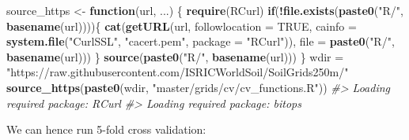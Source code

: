\documentclass[graybox,natbib,nospthms,UStrade]{svmono}
\newenvironment{Shaded}{\begin{snugshade}}{\end{snugshade}}
\newcommand{\CommentTok}[1]{\textcolor[rgb]{0.37,0.37,0.37}{\textit{#1}}}
\newcommand{\ControlFlowTok}[1]{\textcolor[rgb]{0.27,0.27,0.27}{\textbf{#1}}}
\newcommand{\DataTypeTok}[1]{\textcolor[rgb]{0.27,0.27,0.27}{#1}}
\newcommand{\KeywordTok}[1]{\textcolor[rgb]{0.27,0.27,0.27}{\textbf{#1}}}
\newcommand{\NormalTok}[1]{#1}
\newcommand{\OperatorTok}[1]{\textcolor[rgb]{0.43,0.43,0.43}{\textbf{#1}}}
\newcommand{\OtherTok}[1]{\textcolor[rgb]{0.37,0.37,0.37}{#1}}
\newcommand{\StringTok}[1]{\textcolor[rgb]{0.5,0.5,0.5}{#1}}
\begin{document}
\begin{Shaded}
\begin{Highlighting}[]
\NormalTok{source_https <-}\StringTok{ }\ControlFlowTok{function}\NormalTok{(url, ...) \{}
  \KeywordTok{require}\NormalTok{(RCurl)}
  \ControlFlowTok{if}\NormalTok{(}\OperatorTok{!}\KeywordTok{file.exists}\NormalTok{(}\KeywordTok{paste0}\NormalTok{(}\StringTok{"R/"}\NormalTok{, }\KeywordTok{basename}\NormalTok{(url))))\{}
    \KeywordTok{cat}\NormalTok{(}\KeywordTok{getURL}\NormalTok{(url, }\DataTypeTok{followlocation =} \OtherTok{TRUE}\NormalTok{,}
               \DataTypeTok{cainfo =} \KeywordTok{system.file}\NormalTok{(}\StringTok{"CurlSSL"}\NormalTok{, }\StringTok{"cacert.pem"}\NormalTok{, }\DataTypeTok{package =} \StringTok{"RCurl"}\NormalTok{)), }
        \DataTypeTok{file =} \KeywordTok{paste0}\NormalTok{(}\StringTok{"R/"}\NormalTok{, }\KeywordTok{basename}\NormalTok{(url)))}
\NormalTok{  \}}
  \KeywordTok{source}\NormalTok{(}\KeywordTok{paste0}\NormalTok{(}\StringTok{"R/"}\NormalTok{, }\KeywordTok{basename}\NormalTok{(url)))}
\NormalTok{\}}
\NormalTok{wdir =}\StringTok{ "https://raw.githubusercontent.com/ISRICWorldSoil/SoilGrids250m/"}
\KeywordTok{source_https}\NormalTok{(}\KeywordTok{paste0}\NormalTok{(wdir, }\StringTok{"master/grids/cv/cv_functions.R"}\NormalTok{))}
\CommentTok{#> Loading required package: RCurl}
\CommentTok{#> Loading required package: bitops}
\end{Highlighting}
\end{Shaded}

We can hence run 5-fold cross validation:
\end{document}
